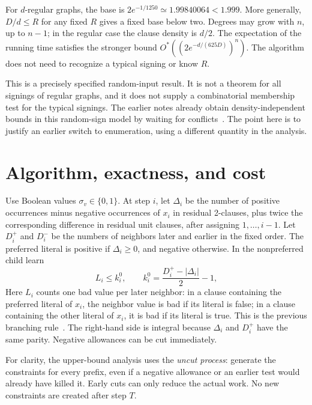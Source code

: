 \documentclass[11pt,a4paper]{article}
\theoremstyle{remark}
\newcommand{\Ostar}{O^{*}}
\begin{document}
For $d$-regular graphs, the base is
$2e^{-1/1250}\simeq1.99840064<1.999$.
More generally, $D/d\le R$ for any fixed $R$ gives a fixed base below two.
Degrees may grow with $n$, up to $n-1$; in the regular case the clause
density is $d/2$. The expectation of the running time satisfies the
stronger bound $\Ostar((2e^{-d/(625D)})^n)$.
The algorithm does not need to recognize a typical signing or know $R$.

This is a precisely specified random-input result. It is not a theorem
for all signings of regular graphs, and it does not supply a combinatorial
membership test for the typical signings. The earlier notes already
obtain density-independent bounds in this random-sign model by waiting
for conflicts~\cite{Key}. The point here is to justify an earlier switch
to enumeration, using a different quantity in the analysis.

\section{Algorithm, exactness, and cost}

Use Boolean values $\sigma_v\in\{0,1\}$. At step $i$, let $\Delta_i$ be
the number of positive occurrences minus negative occurrences of $x_i$
in residual 2-clauses, plus twice the corresponding difference in
residual unit clauses, after assigning $1,\ldots,i-1$.
Let $D_i^+$ and $D_i^-$ be
the numbers of neighbors later and earlier in the fixed order.
The preferred literal is positive if $\Delta_i\ge0$, and negative
otherwise. In the nonpreferred child learn
\begin{equation}
 L_i\le k_i^0,
 \qquad k_i^0=\frac{D_i^+-|\Delta_i|}{2}-1,          \label{eq:learn}
\end{equation}
Here $L_i$ counts one bad value per later neighbor: in a clause containing
the preferred literal of $x_i$, the neighbor value is bad if its literal
is false; in a clause containing the other literal of $x_i$, it is bad
if its literal is true. This is the previous branching
rule~\cite{Plan,Frontier}. The right-hand side is integral because
$\Delta_i$ and $D_i^+$ have the same parity. Negative allowances can be
cut immediately.

For clarity, the upper-bound analysis uses the \emph{uncut process}:
generate the constraints for every prefix, even if a negative allowance
or an earlier test would already have killed it. Early cuts can only
reduce the actual work. No new constraints are created after step $T$.
\end{document}
